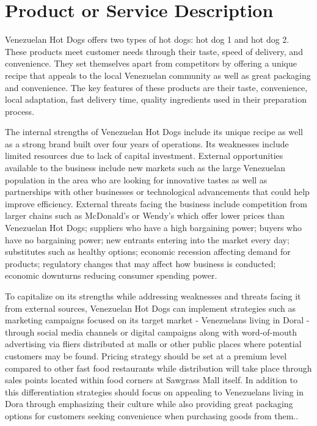

\section{Product or Service Description}\label{sec:product-service}

Venezuelan Hot Dogs offers two types of hot dogs: hot dog 1 and hot dog 2. These products meet customer needs through their taste, speed of delivery, and convenience. They set themselves apart from competitors by offering a unique recipe that appeals to the local Venezuelan community as well as great packaging and convenience. The key features of these products are their taste, convenience, local adaptation, fast delivery time, quality ingredients used in their preparation process. 

The internal strengths of Venezuelan Hot Dogs include its unique recipe as well as a strong brand built over four years of operations. Its weaknesses include limited resources due to lack of capital investment. External opportunities available to the business include new markets such as the large Venezuelan population in the area who are looking for innovative tastes as well as partnerships with other businesses or technological advancements that could help improve efficiency. External threats facing the business include competition from larger chains such as McDonald's or Wendy's which offer lower prices than Venezuelan Hot Dogs; suppliers who have a high bargaining power; buyers who have no bargaining power; new entrants entering into the market every day; substitutes such as healthy options; economic recession affecting demand for products; regulatory changes that may affect how business is conducted; economic downturns reducing consumer spending power. 

To capitalize on its strengths while addressing weaknesses and threats facing it from external sources, Venezuelan Hot Dogs can implement strategies such as marketing campaigns focused on its target market - Venezuelans living in Doral - through social media channels or digital campaigns along with word-of-mouth advertising via fliers distributed at malls or other public places where potential customers may be found. Pricing strategy should be set at a premium level compared to other fast food restaurants while distribution will take place through sales points located within food corners at Sawgrass Mall itself. In addition to this differentiation strategies should focus on appealing to Venezuelans living in Dora through emphasizing their culture while also providing great packaging options for customers seeking convenience when purchasing goods from them.. 

